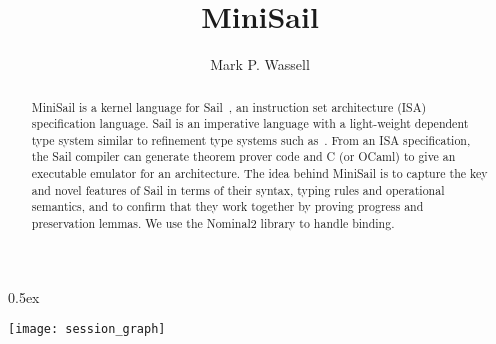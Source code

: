 \documentclass[11pt,a4paper]{report}
\begin{document}
\title{MiniSail}
\author{Mark P. Wassell}
\maketitle

\begin{abstract}
MiniSail is a kernel language for Sail~\cite{Armstrong2019}, 
an instruction set architecture (ISA) specification language. 
Sail is an imperative language with a light-weight dependent type system similar to refinement type systems such as~\cite{Vazou2014}.
From an ISA specification, the Sail compiler can generate theorem prover code and C (or OCaml) to give an executable 
emulator for an architecture.
The idea behind MiniSail is to capture the key and novel features of Sail in terms of their syntax, 
typing rules and operational semantics,
and to confirm that they work together by proving progress and preservation lemmas. 
We use the Nominal2 library to handle binding.
\end{abstract}

\tableofcontents

\parindent 0pt\parskip 0.5ex



\begin{center}
  \texttt{[image: session\_graph]}
\end{center}



\end{document}
